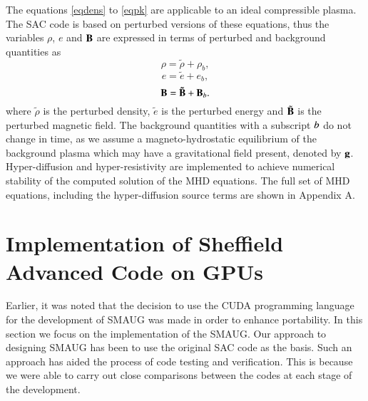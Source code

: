 \documentclass[final,1p]{elsarticle}
\begin{document}
The equations \eqref{eqdens} to \eqref{eqpk} are applicable to an ideal compressible plasma. The SAC code is based on perturbed versions of these equations, thus the variables $\rho $, $e$ and  $\bf B$ are expressed in terms of perturbed and background quantities as
\begin{equation}
\rho = \tilde{\rho}+\rho _{b},
\end{equation}
\begin{equation}
e = \tilde{e}+e _{b},
\end{equation}
\begin{equation}
\bf B = \tilde{\bf B}+{\bf B}_{\it{b}}.
\end{equation}
where $\tilde{\rho}$ is the  perturbed density,  $\tilde{e}$ is the perturbed energy and $\tilde{\bf B}$  is the perturbed magnetic field. The background quantities with a subscript $\it{b}$ do not change in time, as we assume a magneto-hydrostatic equilibrium of the background plasma which may have a gravitational field present, denoted by $\bf g$. Hyper-diffusion and hyper-resistivity \cite{Caunt2001, Stein1998}
are implemented to achieve numerical stability of the computed solution of the MHD equations.  The full set of MHD equations, including the hyper-diffusion source terms are shown in Appendix A.




\section{Implementation of Sheffield Advanced Code on GPUs}
Earlier, it was noted that the decision to  use the CUDA programming language for the development of SMAUG was made in order to enhance portability.  In this section we focus on the implementation of the SMAUG. Our approach to designing SMAUG has been to use the original SAC code as the basis. Such an approach has aided the process of code testing and  verification. This is because we were able to carry out close comparisons between the codes at each stage of the development.
\end{document}
